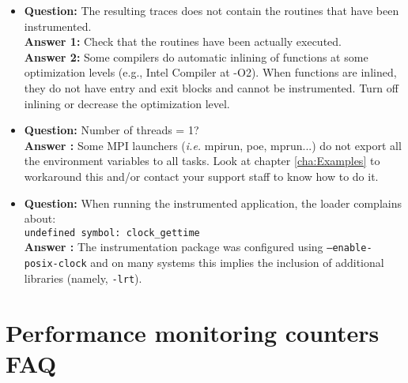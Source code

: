 \begin{itemize}
\item {\bf Question:} The resulting traces does not contain the routines that have been instrumented.\\
      {\bf Answer 1:} Check that the routines have been actually executed.\\
      {\bf Answer 2:} Some compilers do automatic inlining of functions at some optimization levels (e.g., Intel Compiler at -O2). When functions are inlined, they do not have entry and exit blocks and cannot be instrumented. Turn off inlining or decrease the optimization level.

\item {\bf Question:} Number of threads = 1?\\
      {\bf Answer  :} Some MPI launchers ({\it i.e.} mpirun, poe, mprun...) do not export all the environment variables to all tasks. Look at chapter \ref{cha:Examples} to workaround this and/or contact your support staff to know how to do it.

\item {\bf Question:} When running the instrumented application, the loader complains about:\\
              {\tt undefined symbol: clock\_gettime}\\
      {\bf Answer  :} The instrumentation package was configured using {\tt --enable-posix-clock} and on many systems this implies the inclusion of additional libraries (namely, {\tt -lrt}).

\end{itemize}

\section{Performance monitoring counters FAQ}


